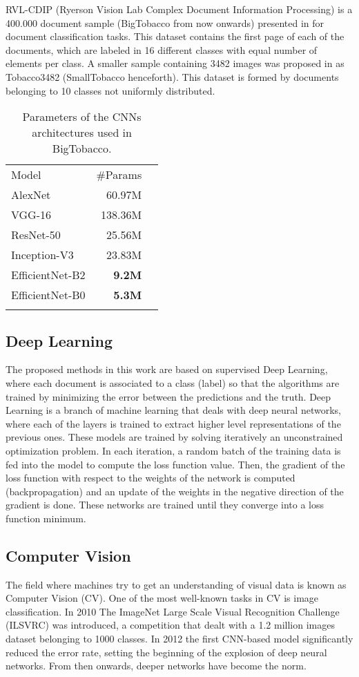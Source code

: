 \documentclass[runningheads]{llncs}
\begin{document}
RVL-CDIP (Ryerson Vision Lab Complex Document Information Processing) is a 400.000 document sample (BigTobacco from now onwards) presented in \cite{BigTobacco} for document classification tasks. This dataset contains the first page of each of the documents, which are labeled in 16 different classes with equal number of elements per class.
A smaller sample containing 3482 images was proposed in \cite{tobacco3482} as Tobacco3482 (SmallTobacco henceforth). This dataset is formed by documents belonging to 10 classes not uniformly distributed.

\begin{small}
\begin{longtable}[]{@{}lrr@{}}
\captionsetup{skip=-11pt} 
\caption{Parameters of the CNNs architectures used in BigTobacco.}\\
\toprule
Model & \#Params\tabularnewline
\midrule
\endhead
AlexNet & 60.97M\tabularnewline
VGG-16 & 138.36M\tabularnewline
ResNet-50 & 25.56M\tabularnewline
Inception-V3 & 23.83M\tabularnewline
EfficientNet-B2 & \textbf{9.2M}\tabularnewline
EfficientNet-B0 & \textbf{5.3M}\tabularnewline
\bottomrule
\label{table:previous_architectures}
\end{longtable}
\end{small}
\vspace{-10.5mm}
\subsection{Deep Learning}

The proposed methods in this work are based on supervised Deep Learning, where each document is associated to a class (label) so that the algorithms are trained by minimizing the error between the predictions and the truth. Deep Learning is a branch of machine learning that deals with deep neural networks, where each of the layers is trained to extract higher level representations of the previous ones. These models are trained by solving iteratively an unconstrained optimization problem. In each iteration, a random batch of the training data is fed into the model to compute the loss function value. Then, the gradient of the loss function with respect to the weights of the network is computed (backpropagation) and an update of the weights in the negative direction of the gradient is done. These networks are trained until they converge into a loss function minimum.

\subsection{Computer Vision}
The field where machines try to get an understanding of visual data is known as Computer Vision (CV). One of the most well-known tasks in CV is image classification. In 2010 The ImageNet Large Scale Visual Recognition Challenge (ILSVRC) was introduced, a competition that dealt with a 1.2 million images dataset belonging to 1000 classes. In 2012 the first CNN-based model significantly reduced the error rate, setting the beginning of the explosion of deep neural networks. From then onwards, deeper networks have become the norm.
\end{document}
